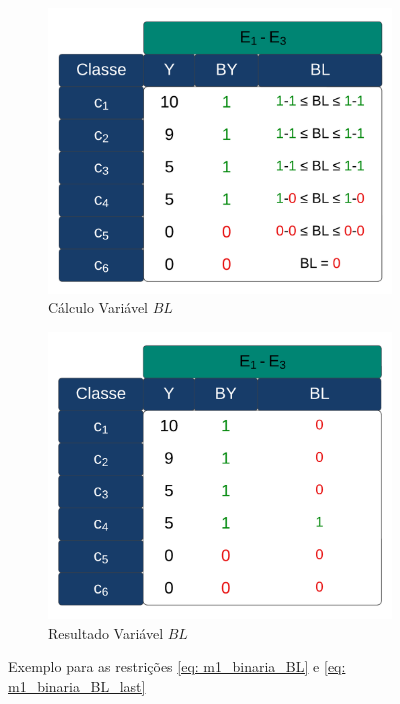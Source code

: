 \begin{figure}[h!]
	\centering
	\begin{subfigure}[b]{0.35\linewidth}
		\includegraphics[width=\linewidth]{img/BL_1.png}
		\caption{Cálculo Variável $BL$}
		\label{fig:BL_1}
	\end{subfigure}\hspace{5mm}
	\begin{subfigure}[b]{0.35\linewidth}
		\includegraphics[width=\linewidth]{img/BL_2.png}
		\caption{Resultado Variável $BL$}
		\label{fig:BL_2}
	\end{subfigure}
	\caption{Exemplo para as restrições \ref{eq: m1_binaria_BL} e \ref{eq: m1_binaria_BL_last}}
	\label{fig:BL}
\end{figure}

